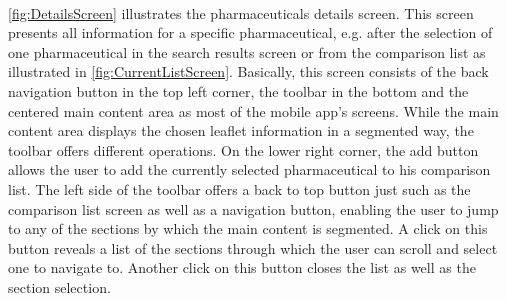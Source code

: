 \\
\ref{fig:DetailsScreen} illustrates the pharmaceuticals details screen. This screen presents all information for a specific pharmaceutical, e.g. after the selection of one pharmaceutical in the search results screen or from the comparison list as illustrated in \ref{fig:CurrentListScreen}. Basically, this screen consists of the back navigation button in the top left corner, the toolbar in the bottom and the centered main content area as most of the mobile app's screens. While the main content area displays the chosen leaflet information in a segmented way, the toolbar offers different operations. On the lower right corner, the add button allows the user to add the currently selected pharmaceutical to his comparison list. The left side of the toolbar offers a back to top button just such as the comparison list screen as well as a navigation button, enabling the user to jump to any of the sections by which the main content is segmented. A click on this button reveals a list of the sections through which the user can scroll and select one to navigate to. Another click on this button closes the list as well as the section selection.

